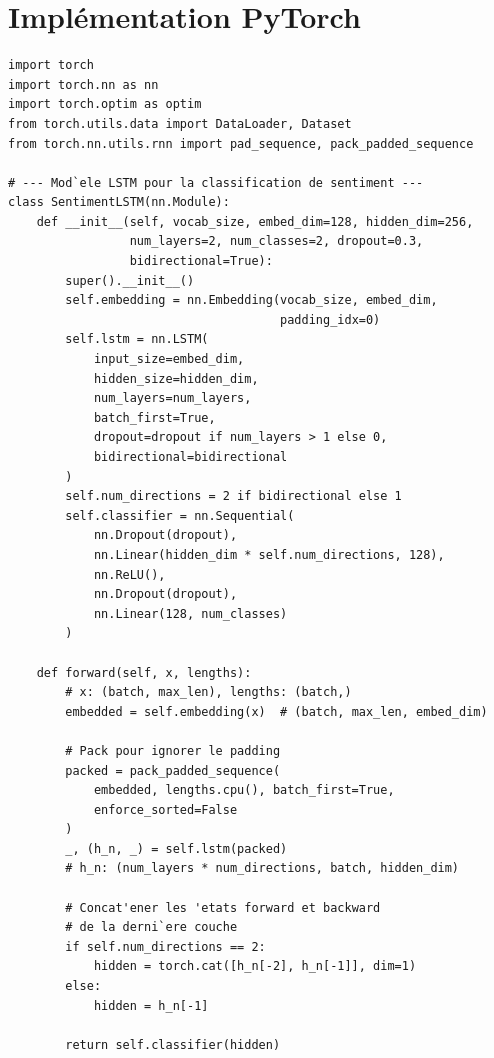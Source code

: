 \section{Impl\'ementation PyTorch}
\label{sec:rnn-pytorch}

\begin{codeblock}[title=\textbf{Classification de s\'equences avec LSTM bidirectionnel}]
\begin{verbatim}
import torch
import torch.nn as nn
import torch.optim as optim
from torch.utils.data import DataLoader, Dataset
from torch.nn.utils.rnn import pad_sequence, pack_padded_sequence

# --- Mod`ele LSTM pour la classification de sentiment ---
class SentimentLSTM(nn.Module):
    def __init__(self, vocab_size, embed_dim=128, hidden_dim=256,
                 num_layers=2, num_classes=2, dropout=0.3,
                 bidirectional=True):
        super().__init__()
        self.embedding = nn.Embedding(vocab_size, embed_dim,
                                      padding_idx=0)
        self.lstm = nn.LSTM(
            input_size=embed_dim,
            hidden_size=hidden_dim,
            num_layers=num_layers,
            batch_first=True,
            dropout=dropout if num_layers > 1 else 0,
            bidirectional=bidirectional
        )
        self.num_directions = 2 if bidirectional else 1
        self.classifier = nn.Sequential(
            nn.Dropout(dropout),
            nn.Linear(hidden_dim * self.num_directions, 128),
            nn.ReLU(),
            nn.Dropout(dropout),
            nn.Linear(128, num_classes)
        )

    def forward(self, x, lengths):
        # x: (batch, max_len), lengths: (batch,)
        embedded = self.embedding(x)  # (batch, max_len, embed_dim)

        # Pack pour ignorer le padding
        packed = pack_padded_sequence(
            embedded, lengths.cpu(), batch_first=True,
            enforce_sorted=False
        )
        _, (h_n, _) = self.lstm(packed)
        # h_n: (num_layers * num_directions, batch, hidden_dim)

        # Concat'ener les 'etats forward et backward
        # de la derni`ere couche
        if self.num_directions == 2:
            hidden = torch.cat([h_n[-2], h_n[-1]], dim=1)
        else:
            hidden = h_n[-1]

        return self.classifier(hidden)


\end{verbatim}
\end{codeblock}
